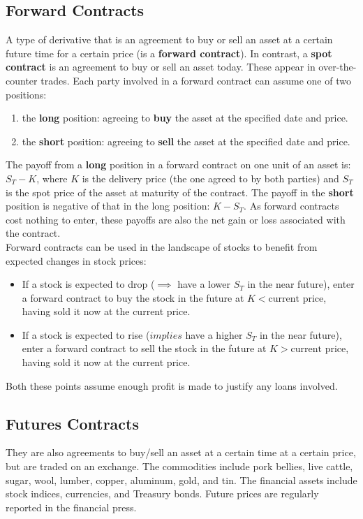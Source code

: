 \documentclass{article}
\begin{document}
\subsection{Forward Contracts}
A type of derivative that is an agreement to buy or sell an asset at a certain
future time for a certain price (is a \textbf{forward contract}). In contrast,
a \textbf{spot contract} is an agreement to buy or sell an asset today. These
appear in over-the-counter trades. Each party
involved in a forward contract can assume one of two positions:
\begin{enumerate}
    \item the \textbf{long} position: agreeing to \textbf{buy} the asset at the specified date and price.
    \item the \textbf{short} position: agreeing to \textbf{sell} the asset at the specified date and price.
\end{enumerate}
The payoff from a \textbf{long} position in a forward contract on one unit of an asset is: $S_T - K$, where
$K$ is the delivery price (the one agreed to by both parties) and $S_T$ is the spot price of the asset
at maturity of the contract. The payoff in the \textbf{short} position is negative of that in the long
position: $K-S_T$. As forward contracts cost nothing to enter, these payoffs are also the net gain or loss
associated with the contract.\\
Forward contracts can be used in the landscape of stocks to benefit from expected changes in stock prices:
\begin{itemize}
    \item If a stock is expected to drop ($\implies$ have a lower $S_T$ in the near future), enter a forward
    contract to buy the stock in the future at $K<\text{current price}$, having sold it now at the current price.
    \item If a stock is expected to rise ($implies$ have a higher $S_T$ in the near future), enter a forward
    contract to sell the stock in the future at $K>\text{current price}$, having sold it now at the current price.
\end{itemize}
Both these points assume enough profit is made to justify any loans involved.
\subsection{Futures Contracts}
They are also agreements to buy/sell an asset at a certain time at a certain price, but are traded on an exchange.
The commodities include pork bellies, live cattle, sugar, wool, lumber,
copper, aluminum, gold, and tin. The financial assets include stock indices, currencies,
and Treasury bonds. Future prices are regularly reported in the financial press.
\end{document}
